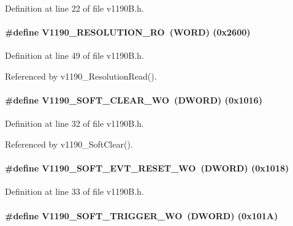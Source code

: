 Definition at line 22 of file v1190B.h.
\paragraph[{V1190\_\-RESOLUTION\_\-RO}]{\setlength{\rightskip}{0pt plus 5cm}\#define V1190\_\-RESOLUTION\_\-RO~({\bf WORD}) (0x2600)}\hfill\label{v1190B_8h_a88a71fb4892c05b52e8a98a9aa07b587}


Definition at line 49 of file v1190B.h.

Referenced by v1190\_\-ResolutionRead().
\paragraph[{V1190\_\-SOFT\_\-CLEAR\_\-WO}]{\setlength{\rightskip}{0pt plus 5cm}\#define V1190\_\-SOFT\_\-CLEAR\_\-WO~({\bf DWORD}) (0x1016)}\hfill\label{v1190B_8h_a798199adf63811cfbb0535e39aa75e03}


Definition at line 32 of file v1190B.h.

Referenced by v1190\_\-SoftClear().
\paragraph[{V1190\_\-SOFT\_\-EVT\_\-RESET\_\-WO}]{\setlength{\rightskip}{0pt plus 5cm}\#define V1190\_\-SOFT\_\-EVT\_\-RESET\_\-WO~({\bf DWORD}) (0x1018)}\hfill\label{v1190B_8h_abf602c132c3f94c1f2f7ee4d8d320683}


Definition at line 33 of file v1190B.h.
\paragraph[{V1190\_\-SOFT\_\-TRIGGER\_\-WO}]{\setlength{\rightskip}{0pt plus 5cm}\#define V1190\_\-SOFT\_\-TRIGGER\_\-WO~({\bf DWORD}) (0x101A)}\hfill\label{v1190B_8h_ae1f804fdd2aa22abe6829587ffc35287}


